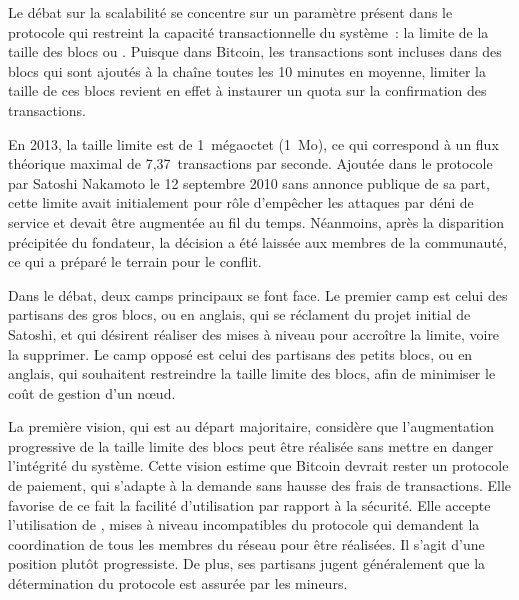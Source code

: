 Le débat sur la scalabilité se concentre sur un paramètre présent dans le protocole qui restreint la capacité transactionnelle du système~: la limite de la taille des blocs ou . Puisque dans Bitcoin, les transactions sont incluses dans des blocs qui sont ajoutés à la chaîne toutes les 10 minutes en moyenne, limiter la taille de ces blocs revient en effet à instaurer un quota sur la confirmation des transactions.

En 2013, la taille limite est de 1~mégaoctet (1~Mo), ce qui correspond à un flux théorique maximal de 7,37~transactions par seconde. Ajoutée dans le protocole par Satoshi Nakamoto le 12 septembre 2010 sans annonce publique de sa part, cette limite avait initialement pour rôle d'empêcher les attaques par déni de service et devait être augmentée au fil du temps. Néanmoins, après la disparition précipitée du fondateur, la décision a été laissée aux membres de la communauté, ce qui a préparé le terrain pour le conflit.

Dans le débat, deux camps principaux se font face. Le premier camp est celui des partisans des gros blocs, ou  en anglais, qui se réclament du projet initial de Satoshi, et qui désirent réaliser des mises à niveau pour accroître la limite, voire la supprimer. Le camp opposé est celui des partisans des petits blocs, ou  en anglais, qui souhaitent restreindre la taille limite des blocs, afin de minimiser le coût de gestion d'un nœud.

La première vision, qui est au départ majoritaire, considère que l'augmentation progressive de la taille limite des blocs peut être réalisée sans mettre en danger l'intégrité du système. Cette vision estime que Bitcoin devrait rester un protocole de paiement, qui s'adapte à la demande sans hausse des frais de transactions. Elle favorise de ce fait la facilité d'utilisation par rapport à la sécurité. Elle accepte l'utilisation de , mises à niveau incompatibles du protocole qui demandent la coordination de tous les membres du réseau pour être réalisées. Il s'agit d'une position plutôt progressiste. De plus, ses partisans jugent généralement que la détermination du protocole est assurée par les mineurs. %

